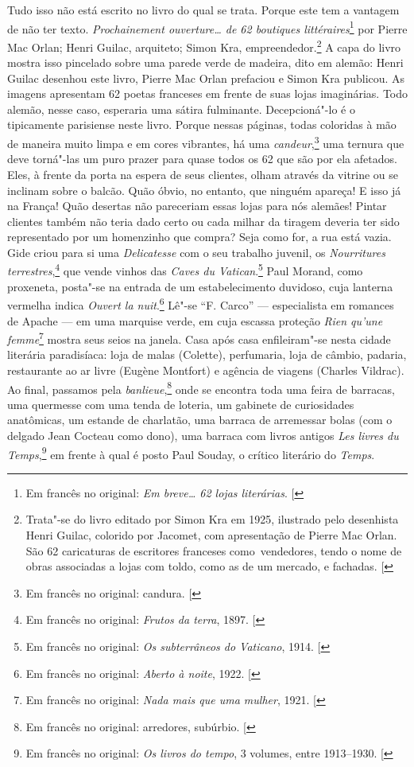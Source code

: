 Tudo isso não está escrito no livro do qual se trata. Porque este tem
a vantagem de não ter texto. \emph{Prochainement ouverture\ldots{} de 62 boutiques littéraires}\footnote{Em francês no original: \emph{Em breve\ldots{} 62 lojas literárias}. {[}\versal{N.~T.}{]}} 
por Pierre Mac Orlan; Henri Guilac, arquiteto; Simon Kra,
empreendedor.\footnote{Trata"-se do
  livro editado por Simon Kra em 1925, ilustrado pelo desenhista Henri
  Guilac, colorido por Jacomet, com apresentação de Pierre Mac Orlan.
  São 62 caricaturas de escritores franceses como~vendedores, tendo o
  nome de obras associadas a lojas com toldo, como as de um mercado, e
  fachadas. {[}\versal{N.~O.}{]}} A capa do livro mostra isso pincelado sobre uma
parede verde de madeira, dito em alemão: Henri Guilac desenhou este
livro, Pierre Mac Orlan prefaciou e Simon Kra publicou. As imagens
apresentam 62 poetas franceses em frente de suas lojas imaginárias. Todo
alemão, nesse caso, esperaria uma sátira fulminante. Decepcioná"-lo é o
tipicamente parisiense neste livro. Porque nessas páginas, todas
coloridas à mão de maneira muito limpa e em cores vibrantes, há uma
\emph{candeur},\footnote{Em francês no original: candura. {[}\versal{N.~T.}{]}}
uma ternura que deve torná"-las um puro prazer para quase todos os 62 que
são por ela afetados. Eles, à frente da porta na espera de seus
clientes, olham através da vitrine ou se inclinam sobre o balcão. Quão
óbvio, no entanto, que ninguém apareça! E isso já na França! Quão
desertas não pareceriam essas lojas para nós alemães! Pintar clientes
também não teria dado certo ou cada milhar da tiragem deveria ter sido
representado por um homenzinho que compra? Seja como for, a rua está
vazia. Gide criou para si uma \emph{Delicatesse} com o seu trabalho
juvenil, os \emph{Nourritures terrestres},\footnote{Em francês no original: \emph{Frutos da
  terra}, 1897. {[}\versal{N.~T.}{]}} que vende vinhos das \emph{Caves
du Vatican}.\footnote{Em francês no original: \emph{Os subterrâneos do Vaticano}, 1914.
  {[}\versal{N.~T.}{]}} Paul Morand, como proxeneta, posta"-se na entrada de um
estabelecimento duvidoso, cuja lanterna vermelha indica \emph{Ouvert la
nuit}.\footnote{Em francês no original: \emph{Aberto à noite}, 1922. {[}\versal{N.~T.}{]}} Lê"-se
``F. Carco'' --- especialista em romances de Apache --- em uma marquise
verde, em cuja escassa proteção \emph{Rien qu'une femme}\footnote{Em francês no original:
\emph{Nada mais que uma mulher}, 1921. {[}\versal{N.~T.}{]}} mostra seus seios na
janela. Casa após casa enfileiram"-se nesta cidade literária paradisíaca:
loja de malas (Colette), perfumaria, loja de câmbio, padaria,
restaurante ao ar livre (Eugène Montfort) e agência de viagens (Charles
Vildrac). Ao final, passamos pela \emph{banlieue},\footnote{Em francês no original: arredores, subúrbio. {[}\versal{N.~T.}{]}} onde se encontra toda
uma feira de barracas, uma quermesse com uma tenda de loteria, um
gabinete de curiosidades anatômicas, um estande de charlatão, uma
barraca de arremessar bolas (com o delgado Jean Cocteau como dono), uma
barraca com livros antigos \emph{Les livres du Temps},\footnote{Em francês no original:
\emph{Os livros do tempo}, 3 volumes, entre 1913--1930. {[}\versal{N.~T.}{]}} em frente à
qual é posto Paul Souday, o crítico literário do \emph{Temps}.

